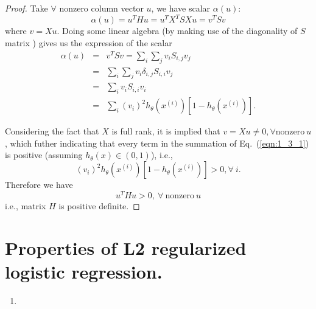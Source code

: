 \documentclass[english,11pt]{article}
\begin{document}
\subsection{} %
\begin{proof}
Take  $\forall$ nonzero column vector $u$, we have scalar $\alpha(u)$:
\begin{equation}
\alpha(u)=u^{T}Hu=u^{T}X^{T}SXu=v^{T}Sv
\end{equation}
where $v=Xu$.  Doing some linear algebra (by making use of the diagonality of $S$ matrix ) gives us the expression of the scalar
\begin{eqnarray}
\alpha(u)	& =&	v^{T}Sv=\sum_{i}\sum_{j}v_{i}S_{i,j}v_{j} \\
	& = &	\sum_{i}\sum_{j}v_{i}\delta_{i,j}S_{i,i}v_{j} \\ 
	& = &	\sum_{i}v_{i}S_{i,i}v_{i} \\
	& = &	\sum_{i}\left(v_{i}\right)^{2}h_{\theta}(x^{(i)})\left[1-h_{\theta}(x^{(i)})\right]. \label{eqn:1_3_1}
\end{eqnarray}

Considering the fact that $X$ is full rank, it is implied that $v=Xu\neq0, \forall \mathrm{nonzero}\ u$, which futher indicating that every term in the summation of Eq.~(\ref{eqn:1_3_1}) is positive (assuming $h_\theta(x)\in(0,1)$), i.e., 
\begin{equation}
\left(v_{i}\right)^{2}h_{\theta}(x^{(i)})\left[1-h_{\theta}(x^{(i)})\right]>0, \forall \ i.
\end{equation}  
Therefore we have
\begin{equation}
u^{T}Hu>0,\ \forall\ \mathrm{nonzero}\ u
\end{equation}
i.e., matrix $H$ is positive definite.
\end{proof}

\section{Properties of L2 regularized logistic regression.}
\begin{enumerate}
\item 
\end{enumerate}
\end{document}
